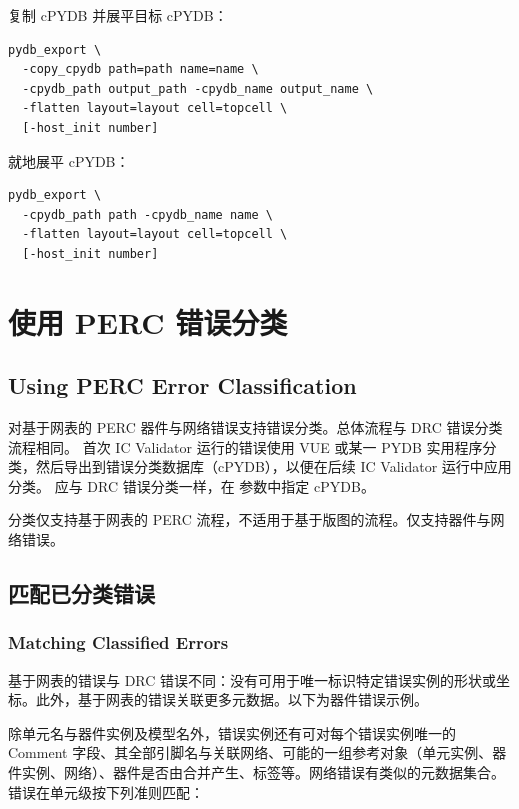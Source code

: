 复制 cPYDB 并展平目标 cPYDB：
\begin{lstlisting}[style=shell]
pydb_export \
  -copy_cpydb path=path name=name \
  -cpydb_path output_path -cpydb_name output_name \
  -flatten layout=layout cell=topcell \
  [-host_init number]
\end{lstlisting}

就地展平 cPYDB：
\begin{lstlisting}[style=shell]
pydb_export \
  -cpydb_path path -cpydb_name name \
  -flatten layout=layout cell=topcell \
  [-host_init number]
\end{lstlisting}

\section{使用 PERC 错误分类}
\subsection*{Using PERC Error Classification}

对基于网表的 PERC 器件与网络错误支持错误分类。总体流程与 DRC 错误分类流程相同。
首次 IC Validator 运行的错误使用 VUE 或某一 PYDB 实用程序分类，然后导出到错误分类数据库（cPYDB），以便在后续 IC Validator 运行中应用分类。
应与 DRC 错误分类一样，在  参数中指定 cPYDB。

\begin{noteBox}
分类仅支持基于网表的 PERC 流程，不适用于基于版图的流程。仅支持器件与网络错误。
\end{noteBox}

\subsection{匹配已分类错误}
\subsubsection*{Matching Classified Errors}

基于网表的错误与 DRC 错误不同：没有可用于唯一标识特定错误实例的形状或坐标。此外，基于网表的错误关联更多元数据。以下为器件错误示例。


除单元名与器件实例及模型名外，错误实例还有可对每个错误实例唯一的 Comment 字段、其全部引脚名与关联网络、可能的一组参考对象（单元实例、器件实例、网络）、器件是否由合并产生、标签等。网络错误有类似的元数据集合。错误在单元级按下列准则匹配：


